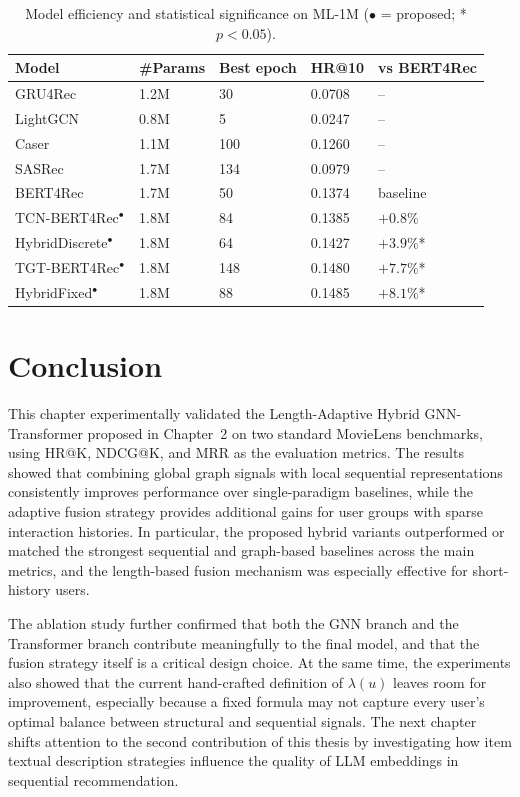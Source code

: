 \documentclass[12pt,a4paper]{report}
\begin{document}
\begin{table}[h]
\centering
\caption{Model efficiency and statistical significance on ML-1M (\(\bullet\) = proposed; * \(p < 0.05\)).}
\label{tab:efficiency}
\begin{tabular}{p{3.8cm} p{2cm} p{2cm} p{2.5cm} p{2.5cm}}
\toprule
\textbf{Model} & \textbf{\#Params} & \textbf{Best epoch} &
\textbf{HR@10} & \textbf{vs BERT4Rec} \\
\midrule
GRU4Rec              & 1.2M & 30  & 0.0708 & -- \\
LightGCN             & 0.8M & 5   & 0.0247 & -- \\
Caser                & 1.1M & 100 & 0.1260 & -- \\
SASRec               & 1.7M & 134 & 0.0979 & -- \\
BERT4Rec             & 1.7M & 50  & 0.1374 & baseline \\
TCN-BERT4Rec\(^\bullet\)   & 1.8M & 84  & 0.1385 & \(+0.8\%\) \\
HybridDiscrete\(^\bullet\) & 1.8M & 64  & 0.1427 & \(+3.9\%\)*  \\
TGT-BERT4Rec\(^\bullet\)   & 1.8M & 148 & 0.1480 & \(+7.7\%\)*  \\
\mbox{HybridFixed}\(^\bullet\)    & 1.8M & 88  & 0.1485 & \(+8.1\%\)*  \\
\bottomrule
\end{tabular}
\end{table}

\clearpage
\section{Conclusion}
\label{sec:ch3conclusion}

\justifying
This chapter experimentally validated the Length-Adaptive Hybrid GNN-Transformer
proposed in Chapter~2 on two standard MovieLens benchmarks, using HR@K,
NDCG@K, and MRR as the evaluation metrics. The results showed that combining
global graph signals with local sequential representations consistently improves
performance over single-paradigm baselines, while the adaptive fusion strategy
provides additional gains for user groups with sparse interaction histories.
In particular, the proposed hybrid variants outperformed or matched the
strongest sequential and graph-based baselines across the main metrics, and the
length-based fusion mechanism was especially effective for short-history users.

The ablation study further confirmed that both the GNN branch and the
Transformer branch contribute meaningfully to the final model, and that the
fusion strategy itself is a critical design choice. At the same time, the
experiments also showed that the current hand-crafted definition of
\(\lambda(u)\) leaves room for improvement, especially because a fixed formula
may not capture every user's optimal balance between structural and sequential
signals. The next chapter shifts attention to the second contribution of this
thesis by investigating how item textual description strategies influence the
quality of LLM embeddings in sequential recommendation.
\end{document}
